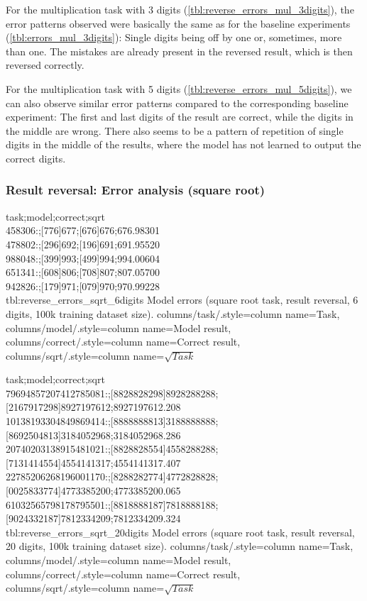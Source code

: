 For the multiplication task with 3 digits (\cref{tbl:reverse_errors_mul_3digits}), the error patterns observed were basically the same as for the baseline experiments  (\cref{tbl:errors_mul_3digits}): Single digits being off by one or, sometimes, more than one.
The mistakes are already present in the reversed result,
which is then reversed correctly.

For the multiplication task with 5 digits (\cref{tbl:reverse_errors_mul_5digits}), we can also observe similar error patterns compared to the corresponding baseline experiment: The first and last digits of the result are correct, while the digits in the middle are wrong.
There also seems to be a pattern of repetition of single digits in the middle of the results, where the model has not learned to output the correct digits.

\subsubsection{Result reversal: Error analysis (square root)}

{
task;model;correct;sqrt\\
458306:;[776]677;[676]676;676.98301\\
478802:;[296]692;[196]691;691.95520\\
988048:;[399]993;[499]994;994.00604\\
651341:;[608]806;[708]807;807.05700\\
942826:;[179]971;[079]970;970.99228\\
}
{tbl:reverse_errors_sqrt_6digits}
{
    Model errors (square root task, result reversal, 6 digits, 100k training dataset size).
}
{
    columns/task/.style={column name={Task}},
    columns/model/.style={column name={Model result}},
    columns/correct/.style={column name={Correct result}},
    columns/sqrt/.style={column name={$\sqrt{Task}$}}
}

{
task;model;correct;sqrt\\
79694857207412785081:;[8828828298]8928288288;[2167917298]8927197612;8927197612.208\\
10138193304849869414:;[8888888813]3188888888;[8692504813]3184052968;3184052968.286\\
20740203138915481021:;[8828828554]4558288288;[7131414554]4554141317;4554141317.407\\
22785206268196001170:;[8288282774]4772828828;[0025833774]4773385200;4773385200.065\\
61032565798178795501:;[8818888187]7818888188;[9024332187]7812334209;7812334209.324\\
}
{tbl:reverse_errors_sqrt_20digits}
{
    Model errors (square root task, result reversal, 20 digits, 100k training dataset size).
}
{
    columns/task/.style={column name={Task}},
    columns/model/.style={column name={Model result}},
    columns/correct/.style={column name={Correct result}},
    columns/sqrt/.style={column name={$\sqrt{Task}$}}
}

